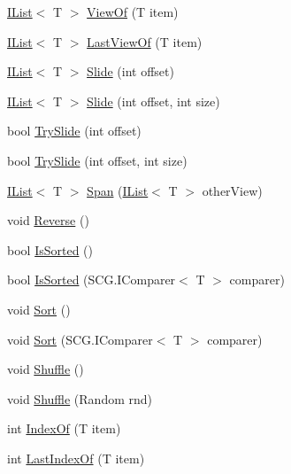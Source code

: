 \begin{DoxyCompactItemize}
\item 
\hyperlink{interface_c5_1_1_i_list}{I\+List}$<$ T $>$ \hyperlink{class_c5_1_1_wrapped_array_a819a47c4c0f0ee0397c337e340f86ea1}{View\+Of} (T item)
\item 
\hyperlink{interface_c5_1_1_i_list}{I\+List}$<$ T $>$ \hyperlink{class_c5_1_1_wrapped_array_a40efb134cd66039cafc0ebc09e3db6e5}{Last\+View\+Of} (T item)
\item 
\hyperlink{interface_c5_1_1_i_list}{I\+List}$<$ T $>$ \hyperlink{class_c5_1_1_wrapped_array_ac15daa69646bd07b1c33d7f3e54fc664}{Slide} (int offset)
\item 
\hyperlink{interface_c5_1_1_i_list}{I\+List}$<$ T $>$ \hyperlink{class_c5_1_1_wrapped_array_a72fe70449ee7b4120ce1f64bd1943de3}{Slide} (int offset, int size)
\item 
bool \hyperlink{class_c5_1_1_wrapped_array_a2f4793463aba25b83c876312f0f38f88}{Try\+Slide} (int offset)
\item 
bool \hyperlink{class_c5_1_1_wrapped_array_ade9062f9faaa9a455d78e34a39dec3bb}{Try\+Slide} (int offset, int size)
\item 
\hyperlink{interface_c5_1_1_i_list}{I\+List}$<$ T $>$ \hyperlink{class_c5_1_1_wrapped_array_a78ce164344790af3bad84352c2acf58d}{Span} (\hyperlink{interface_c5_1_1_i_list}{I\+List}$<$ T $>$ other\+View)
\item 
void \hyperlink{class_c5_1_1_wrapped_array_a4c136a663e90a6451a0685d281ebdf0b}{Reverse} ()
\item 
bool \hyperlink{class_c5_1_1_wrapped_array_af134399df22e512094a27e95cd147b13}{Is\+Sorted} ()
\item 
bool \hyperlink{class_c5_1_1_wrapped_array_a63b841f528e5b8b1768687b73e755644}{Is\+Sorted} (S\+C\+G.\+I\+Comparer$<$ T $>$ comparer)
\item 
void \hyperlink{class_c5_1_1_wrapped_array_a3713559b09931e18ca05b7a755a23f21}{Sort} ()
\item 
void \hyperlink{class_c5_1_1_wrapped_array_a419a2d9c1377150e6dd473e32ddde903}{Sort} (S\+C\+G.\+I\+Comparer$<$ T $>$ comparer)
\item 
void \hyperlink{class_c5_1_1_wrapped_array_a77f7b39c84abba94c4a144da3ce2baff}{Shuffle} ()
\item 
void \hyperlink{class_c5_1_1_wrapped_array_a8307d48388d587aa244d01e6d2079722}{Shuffle} (Random rnd)
\item 
int \hyperlink{class_c5_1_1_wrapped_array_a459af83c432f3dbc167d406c4632fb0e}{Index\+Of} (T item)
\item 
int \hyperlink{class_c5_1_1_wrapped_array_aebda540a1e886890698d527f53d99343}{Last\+Index\+Of} (T item)

\end{DoxyCompactItemize}
